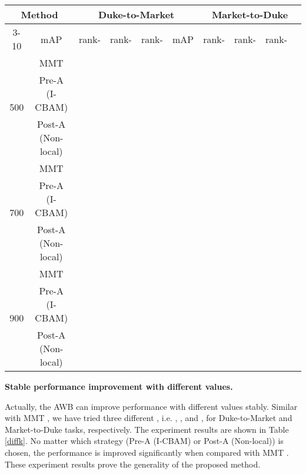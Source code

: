 \documentclass[journal]{IEEEtran}
\begin{document}
\begin{table*}
\centering
\caption{The performance of the proposed AWB under different  values. AWB outperforms MMT \cite{ge2020mutual} continuously.} 
  \begin{tabular}{|*{10}{c|}}\hline
    \multicolumn{2}{|c|}{\multirow{2}{*}{Method}}  & \multicolumn{4}{c|}{Duke-to-Market} & \multicolumn{4}{c|}{Market-to-Duke}\\\cline{3-10}
    \multicolumn{2}{|c|}{}   & mAP & rank- & rank- & rank- & mAP & rank- & rank- & rank- \\\hline
    \multirow{3}{*}{500} & MMT \cite{ge2020mutual} &  &  &  &  &  &  &  &  \\\cline{2-2}
        & Pre-A (I-CBAM) &  & &  &  &  &  &  &  \\\cline{2-2}
        & Post-A (Non-local) &  &  &  &  &  &  &  &  \\\hline
    \multirow{3}{*}{700} & MMT \cite{ge2020mutual} &  &  &  &  &  &  &  &  \\\cline{2-2}
        & Pre-A (I-CBAM) &  &  &  &  &  &  &  &  \\\cline{2-2}
        & Post-A (Non-local) &  &  &  &  &  &  &  &  \\\hline
    \multirow{3}{*}{900} & MMT \cite{ge2020mutual} &  &  &  &  &  &  &  &  \\\cline{2-2}
        & Pre-A (I-CBAM)&  &  &  &  & &  &  &  \\\cline{2-2}
        & Post-A (Non-local) &  &  &  &  &  &  & &  \\\hline
  \end{tabular}
\label{diffk}
\end{table*}










\textbf{Stable performance improvement with different  values.}\par 
Actually, the AWB can improve performance with different  values stably. Similar with MMT \cite{ge2020mutual}, we have tried three different , i.e. , , and , for Duke-to-Market and Market-to-Duke tasks, respectively. The experiment results are shown in Table \ref{diffk}. No matter which strategy (Pre-A (I-CBAM) or Post-A (Non-local)) is chosen, the performance is improved significantly when compared with MMT \cite{ge2020mutual}. These experiment results prove the generality of the proposed method. \par
\end{document}
